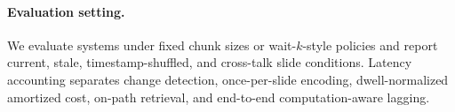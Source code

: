 \paragraph{Evaluation setting.}
We evaluate systems under fixed chunk sizes or wait-$k$-style policies and
report current, stale, timestamp-shuffled, and cross-talk slide conditions.
Latency accounting separates change detection, once-per-slide encoding,
dwell-normalized amortized cost, on-path retrieval, and end-to-end
computation-aware lagging.
